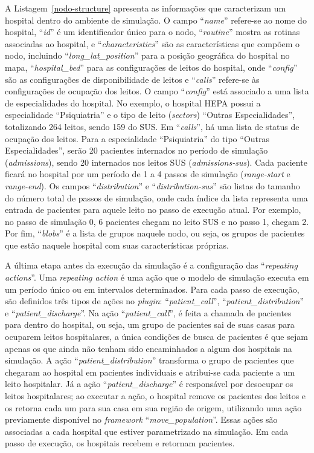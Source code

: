 A Listagem~\ref{nodo-structure} apresenta as informações que caracterizam um hospital dentro do ambiente de simulação. O campo ``\textit{name}'' refere-se ao nome do hospital, ``\textit{id}'' é um identificador único para o nodo, ``\textit{routine}'' mostra as rotinas associadas ao hospital, e ``\textit{characteristics}'' são as características que compõem o nodo, incluindo ``\textit{long\_lat\_position}'' para a posição geográfica do hospital no mapa, ``\textit{hospital\_bed}'' para as configurações de leitos do hospital, onde ``\textit{config}'' são as configurações de disponibilidade de leitos e ``\textit{calls}'' refere-se às configurações de ocupação dos leitos. O campo ``\textit{config}'' está associado a uma lista de especialidades do hospital. No exemplo, o hospital HEPA possui a especialidade ``Psiquiatria'' e o tipo de leito (\textit{sectors}) ``Outras Especialidades'', totalizando 264 leitos, sendo 159 do SUS. Em ``\textit{calls}'', há uma lista de status de ocupação dos leitos. Para a especialidade ``Psiquiatria'' do tipo ``Outras Especialidades'', serão 20 pacientes internados no período de simulação (\textit{admissions}), sendo 20 internados nos leitos SUS (\textit{admissions-sus}). Cada paciente ficará no hospital por um período de 1 a 4 passos de simulação (\textit{range-start} e \textit{range-end}). Os campos ``\textit{distribution}'' e ``\textit{distribution-sus}'' são listas do tamanho do número total de passos de simulação, onde cada índice da lista representa uma entrada de pacientes para aquele leito no passo de execução atual. Por exemplo, no passo de simulação 0, 6 pacientes chegam no leito SUS e no passo 1, chegam 2. Por fim, ``\textit{blobs}'' é a lista de grupos naquele nodo, ou seja, os grupos de pacientes que estão naquele hospital com suas características próprias.

A última etapa antes da execução da simulação é a configuração das ``\textit{repeating actions}''. Uma \textit{repeating action} é uma ação que o modelo de simulação executa em um período único ou em intervalos determinados. Para cada passo de execução, são definidos três tipos de ações no \textit{plugin}: ``\textit{patient\_call}'', ``\textit{patient\_distribution}'' e ``\textit{patient\_discharge}''. Na ação ``\textit{patient\_call}'', é feita a chamada de pacientes para dentro do hospital, ou seja, um grupo de pacientes sai de suas casas para ocuparem leitos hospitalares, a única condições de busca de pacientes é que sejam apenas os que ainda não tenham sido encaminhados a algum dos hospitais na simulação. A ação ``\textit{patient\_distribution}'' transforma o grupo de pacientes que chegaram ao hospital em pacientes individuais e atribui-se cada paciente a um leito hospitalar. Já a ação ``\textit{patient\_discharge}'' é responsável por desocupar os leitos hospitalares; ao executar a ação, o hospital remove os pacientes dos leitos e os retorna cada um para sua casa em sua região de origem, utilizando uma ação previamente disponível no \textit{framework} ``\textit{move\_population}''. Essas ações são associadas a cada hospital que estiver parametrizado na simulação. Em cada passo de execução, os hospitais recebem e retornam pacientes.

